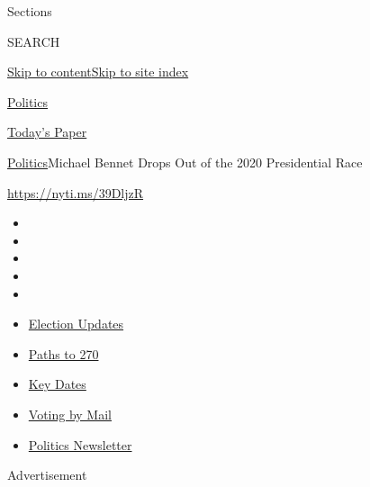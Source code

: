 Sections

SEARCH

\protect\hyperlink{site-content}{Skip to
content}\protect\hyperlink{site-index}{Skip to site index}

\href{https://www.nytimes3xbfgragh.onion/section/politics}{Politics}

\href{https://myaccount.nytimes3xbfgragh.onion/auth/login?response_type=cookie\&client_id=vi}{}

\href{https://www.nytimes3xbfgragh.onion/section/todayspaper}{Today's
Paper}

\href{/section/politics}{Politics}\textbar{}Michael Bennet Drops Out of
the 2020 Presidential Race

\url{https://nyti.ms/39DljzR}

\begin{itemize}
\item
\item
\item
\item
\item
\end{itemize}

\begin{itemize}
\item
  \href{https://www.nytimes3xbfgragh.onion/live/2020/09/11/us/trump-vs-biden?action=click\&pgtype=Article\&state=default\&region=TOP_BANNER\&context=storylines_menu}{Election
  Updates}
\item
  \href{https://www.nytimes3xbfgragh.onion/interactive/2020/us/elections/election-states-biden-trump.html?action=click\&pgtype=Article\&state=default\&region=TOP_BANNER\&context=storylines_menu}{Paths
  to 270}
\item
  \href{https://www.nytimes3xbfgragh.onion/interactive/2019/us/elections/2020-presidential-election-calendar.html?action=click\&pgtype=Article\&state=default\&region=TOP_BANNER\&context=storylines_menu}{Key
  Dates}
\item
  \href{https://www.nytimes3xbfgragh.onion/interactive/2020/08/31/us/politics/vote-by-mail-deadlines.html?action=click\&pgtype=Article\&state=default\&region=TOP_BANNER\&context=storylines_menu}{Voting
  by Mail}
\item
  \href{https://www.nytimes3xbfgragh.onion/newsletters/politics?action=click\&pgtype=Article\&state=default\&region=TOP_BANNER\&context=storylines_menu}{Politics
  Newsletter}
\end{itemize}

Advertisement

